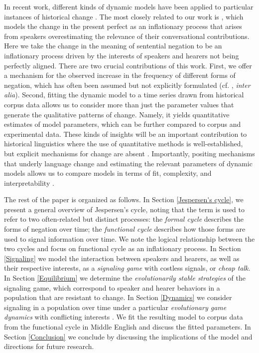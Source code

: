 \documentclass[linguex]{sp}
\theoremstyle{definition} \newtheorem{definition}{Definition}
\begin{document}
In recent work, different kinds of dynamic models have been applied to particular instances of historical change \citep{schaden2012, deo2015, yanovich2015, enke2016}. The most closely related to our work is \cite{schaden2012}, which models the change in the present perfect as an inflationary process that arises from speakers overestimating the relevance of their conversational contributions. Here we take the change in the meaning of sentential negation to be an inflationary process driven by the interests of speakers and hearers not being perfectly aligned. There are two crucial contributions of this work. First, we offer a mechanism for the observed increase in the frequency of different forms of negation, which has often been assumed but not explicitly formulated (cf. \citealt{detges-waltereit2002, hopper-traugottt2003, kiparsky-condoravdi:2006}, \emph{inter alia}).  Second, fitting the dynamic model to a time series drawn from historical corpus data allows us to consider more than just the parameter values that generate the qualitative patterns of change. Namely, it yields quantitative estimates of model parameters, which can be further compared to corpus and experimental data.  These kinds of insights will be an important contribution to historical linguistics where the use of quantitative methods is well-established, but explicit mechanisms for change are absent \citep[4]{kroch1989}. Importantly, positing mechanisms that underly language change and estimating the relevant parameters of dynamic models allows us to compare models in terms of fit, complexity, and interpretability \citep{burnham2003}. 

The rest of the paper is organized as follows. In Section \ref{Jespersen's cycle}, we present a general overview of Jespersen's cycle, noting that the term is used to refer to two often-related but distinct processes: the \emph{formal cycle} describes the forms of negation over time; the \emph{functional cycle} describes how those forms are used to signal information over time. We note the logical relationship between the two cycles and focus on functional cycle as an inflationary process. In Section \ref{Signaling} we model the interaction between speakers and hearers, as well as their respective interests, as a \emph{signaling game} with costless signals, or \emph{cheap talk}. In Section \ref{Equilibrium} we determine the \emph{evolutionarily stable strategies} of the signaling game, which correspond to speaker and hearer behaviors in a population that are resistant to change. In Section \ref{Dynamics} we consider signaling in a population over time under a particular \emph{evolutionary game dynamics} with conflicting interests . We fit the resulting model to corpus data from the functional cycle in Middle English and discuss the fitted parameters. In Section \ref{Conclusion} we conclude by discussing the implications of the model and directions for future research.
\end{document}
